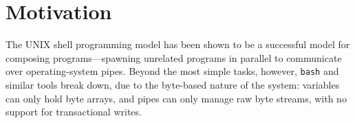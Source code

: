 \documentclass[english,preprint,JIP]{ipsj}
\begin{document}
\begin{abstract}
%
%
%
\end{abstract}

\maketitle

\section{Motivation}

The UNIX shell programming model has been shown to be a successful model for composing programs---spawning unrelated programs in parallel to communicate over operating-system pipes. Beyond the most simple tasks, however, \verb/bash/ and similar tools break down, due to the byte-based nature of the system: variables can only hold byte arrays, and pipes can only manage raw byte streams, with no support for transactional writes.
\end{document}
